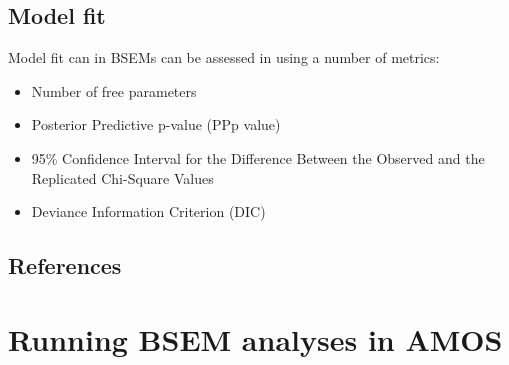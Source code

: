 \documentclass[]{book}
\providecommand{\tightlist}{%
  \setlength{\itemsep}{0pt}\setlength{\parskip}{0pt}}
\begin{document}
\hypertarget{model-fit}{%
\section{Model fit}\label{model-fit}}

Model fit can in BSEMs can be assessed in using a number of metrics:

\begin{itemize}
\tightlist
\item
  Number of free parameters
\item
  Posterior Predictive p-value (PPp value)
\item
  95\% Confidence Interval for the Difference Between the Observed and the Replicated Chi-Square Values
\item
  Deviance Information Criterion (DIC)
\end{itemize}

\hypertarget{references-1}{%
\section{References}\label{references-1}}

\hypertarget{running-bsem-analyses-in-amos}{%
\chapter{Running BSEM analyses in AMOS}\label{running-bsem-analyses-in-amos}}
\end{document}

